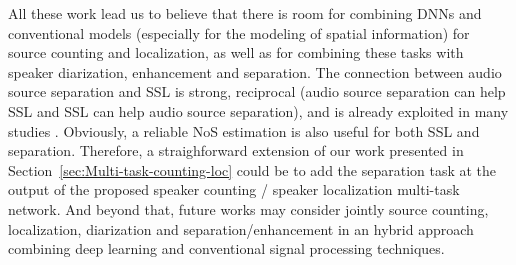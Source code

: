 All these work lead us to believe that there is room for combining DNNs and conventional models (especially for the modeling of spatial information) for source counting and localization, as well as for combining these tasks with speaker diarization, enhancement and separation. The connection between audio source separation and SSL is strong, reciprocal (audio source separation can help  SSL and SSL can help audio source separation), and is already exploited in many studies \cite{vincent_audio_2018, gannot2017consolidated}. Obviously, a reliable NoS estimation is also useful for both SSL and separation. Therefore, a straighforward extension of our work presented in Section~\ref{sec:Multi-task-counting-loc} could be to add the separation task at the output of the proposed speaker counting / speaker localization multi-task network. And beyond that, future works may consider jointly source counting, localization, diarization and separation/enhancement in an hybrid approach combining deep learning and conventional signal processing techniques.

